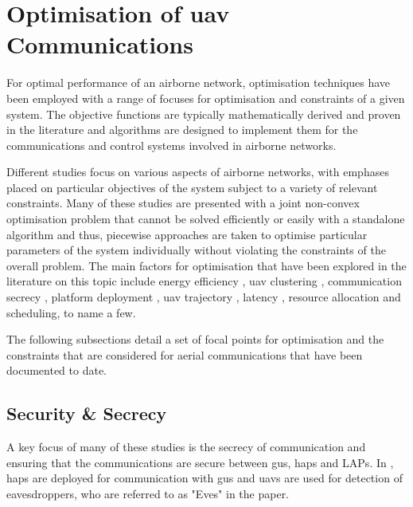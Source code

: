 \section{Optimisation of \texorpdfstring{\acrshort{uav}}{UAV} Communications}
For optimal performance of an airborne network, optimisation techniques have been employed with a range of focuses for optimisation and constraints of a given system. 
The objective functions are typically mathematically derived and proven in the literature and algorithms are designed to implement them for the communications and control systems involved in airborne networks. 

Different studies focus on various aspects of airborne networks, with emphases placed on particular objectives of the system subject to a variety of relevant constraints. 
Many of these studies are presented with a joint non-convex optimisation problem that cannot be solved efficiently or easily with a standalone algorithm and thus, piecewise approaches are taken to optimise particular parameters of the system individually without violating the constraints of the overall problem. 
The main factors for optimisation that have been explored in the literature on this topic include energy efficiency \cite{zhao_energy_2023, zhang_energy-efficient_2024}, \acrshort{uav} clustering \cite{zhao_energy_2023, jeong_quantum_2025}, communication secrecy \cite{zhang_one_2025, mu_security_2021, yan_secure_2022}, platform deployment \cite{ji_joint_2023}, \acrshort{uav} trajectory \cite{zhao_energy_2023}, latency \cite{saravanan_optimizing_2024}, resource allocation\cite{ji_joint_2023} and scheduling, to name a few. 

The following subsections detail a set of focal points for optimisation and the constraints that are considered for aerial communications that have been documented to date. 
\subsection{Security \& Secrecy}
A key focus of many of these studies is the secrecy of communication and ensuring that the communications are secure between \acrshort{gu}s, \acrshort{hap}s and LAPs\cite{qin_secure_2023, zhang_one_2025, yan_secure_2022, mu_security_2021, lohan_secrecy-aware_2022}. In \cite{zhang_one_2025}, \acrshort{hap}s are deployed for communication with \acrshort{gu}s and \acrshort{uav}s are used for detection of eavesdroppers, who are referred to as "Eves" in the paper. 

